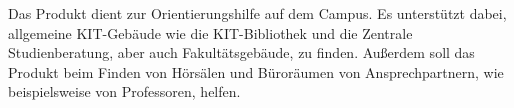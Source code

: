 Das Produkt dient zur Orientierungshilfe auf dem \Gls{Campus}.
Es unterstützt dabei, allgemeine \Gls{KIT}-Gebäude wie die \Gls{KIT}-Bibliothek und die Zentrale Studienberatung, aber auch Fakultätsgebäude, zu finden. 
Außerdem soll das Produkt beim Finden von Hörsälen und Büroräumen von Ansprechpartnern, wie beispielsweise von Professoren, helfen.

